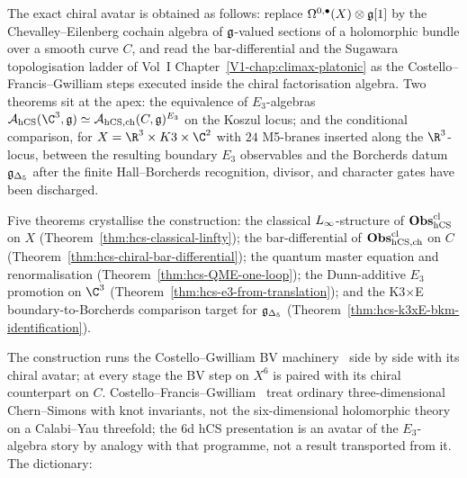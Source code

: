 The exact chiral avatar is obtained as follows: replace
$\Omega^{0,\bullet}(X)\otimes\mathfrak{g}[1]$ by the Chevalley--Eilenberg
cochain algebra of $\mathfrak{g}$-valued sections of a holomorphic bundle over
a smooth curve $C$, and read the bar-differential and the
Sugawara topologisation ladder of Vol~I
Chapter~\ref{V1-chap:climax-platonic} as the Costello--Francis--Gwilliam
steps executed inside the chiral factorisation algebra. Two theorems
sit at the apex: the equivalence of $E_3$-algebras
$\cA_{\hCS}(\C^3,\fg)\simeq\cA_{\hCS,\mathrm{ch}}(C,\fg)^{E_3}$ on the
Koszul locus; and the conditional comparison, for
$X = \R^3\times K3\times\C^2$ with $24$ M5-branes inserted along the
$\R^3$-locus, between the resulting boundary $E_3$ observables and the
Borcherds datum $\mathfrak{g}_{\Delta_5}$ after the finite Hall--Borcherds
recognition, divisor, and character gates have been discharged.

Five theorems crystallise the construction: the classical $L_\infty$-structure
of $\mathbf{Obs}^{\mathrm{cl}}_{\mathrm{hCS}}$ on $X$ (Theorem~\ref{thm:hcs-classical-linfty});
the bar-differential of $\mathbf{Obs}^{\mathrm{cl}}_{\mathrm{hCS},\mathrm{ch}}$ on $C$
(Theorem~\ref{thm:hcs-chiral-bar-differential}); the quantum
master equation and renormalisation
(Theorem~\ref{thm:hcs-QME-one-loop});
the Dunn-additive $E_3$ promotion on $\C^3$
(Theorem~\ref{thm:hcs-e3-from-translation}); and the K3$\times$E
boundary-to-Borcherds comparison target for $\mathfrak{g}_{\Delta_5}$
(Theorem~\ref{thm:hcs-k3xE-bkm-identification}).

The construction runs the Costello--Gwilliam BV
machinery~\cite{CostelloRenormalization,CostelloGwilliam2017,CostelloGwilliam2021}
side by side with its chiral avatar; at every stage
the BV step on $X^6$ is paired with its chiral counterpart on
$C$. Costello--Francis--Gwilliam~\cite{CFG2026} treat ordinary
three-dimensional Chern--Simons with knot invariants, not the
six-dimensional holomorphic theory on a Calabi--Yau threefold; the 6d
hCS presentation is an avatar of the $E_3$-algebra story by analogy
with that programme, not a result transported from it. The dictionary:

